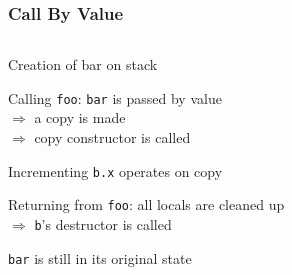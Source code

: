 \begin{frame}
  \frametitle{Call By Value}
  \begin{center}
    \begin{columns}
      \column{6cm}
      \column{6cm}
    \end{columns}
  \end{center}
  \vskip2mm
  \begin{overprint}
    \begin{center}
      Creation of bar on stack
    \end{center}

    \begin{center}
      Calling {\tt foo}: {\tt bar} is passed by value \\
      $\Rightarrow$ a copy is made \\
      $\Rightarrow$ copy constructor is called
    \end{center}

    \begin{center}
      Incrementing {\tt b.x} operates on copy
    \end{center}

    \begin{center}
      Returning from {\tt foo}: all locals are cleaned up \\
      $\Rightarrow$ {\tt b}'s destructor is called \\
    \end{center}

    \begin{center}
      {\tt bar} is still in its original state
    \end{center}
  \end{overprint}
\end{frame}

